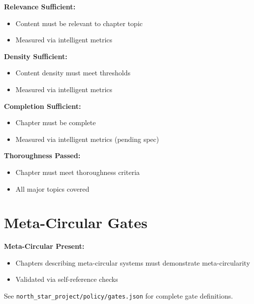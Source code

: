 \textbf{Relevance Sufficient:}
\begin{itemize}
    \item Content must be relevant to chapter topic
    \item Measured via intelligent metrics
\end{itemize}

\textbf{Density Sufficient:}
\begin{itemize}
    \item Content density must meet thresholds
    \item Measured via intelligent metrics
\end{itemize}

\textbf{Completion Sufficient:}
\begin{itemize}
    \item Chapter must be complete
    \item Measured via intelligent metrics (pending spec)
\end{itemize}

\textbf{Thoroughness Passed:}
\begin{itemize}
    \item Chapter must meet thoroughness criteria
    \item All major topics covered
\end{itemize}

\section*{Meta-Circular Gates}

\textbf{Meta-Circular Present:}
\begin{itemize}
    \item Chapters describing meta-circular systems must demonstrate meta-circularity
    \item Validated via self-reference checks
\end{itemize}

See \texttt{north\_star\_project/policy/gates.json} for complete gate definitions.


